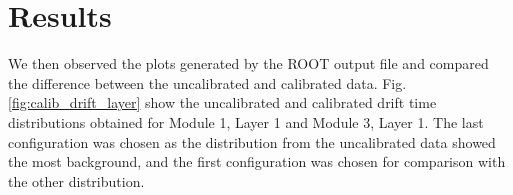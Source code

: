 \documentclass[a4paper]{report}
\numberwithin{equation}{section}
\begin{document}
\section{Results} \label{sec:calib_results}

We then observed the plots generated by the ROOT output file and compared the difference between the uncalibrated and 
calibrated data. Fig. \ref{fig:calib_drift_layer} show the uncalibrated and calibrated drift time distributions obtained for Module 1, Layer 1 and 
Module 3, Layer 1. The last configuration was chosen as the distribution from the uncalibrated data showed the most background, and the first 
configuration was chosen for comparison with the other distribution. \par

\begin{figure}[htb!]
	\centering
	\quad
	\centering
	\quad
	\centering
	\quad
	\centering

\end{figure}
\end{document}
